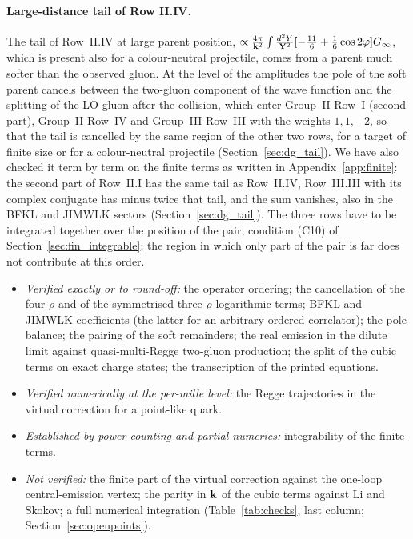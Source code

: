 \paragraph{Large-distance tail of Row II.IV.} The tail of Row~II.IV at large parent position, $\propto\frac{4\pi}{\mathbf{k}^2}\int\frac{d^2Y}{\mathbf{Y}^2}[-\frac{11}{6}+\frac16\cos2\varphi]G_\infty$, which is present also for a colour-neutral projectile, comes from a parent much softer than the observed gluon. At the level of the amplitudes the pole of the soft parent cancels between the two-gluon component of the wave function and the splitting of the LO gluon after the collision, which enter Group~II Row~I (second part), Group~II Row~IV and Group~III Row~III with the weights $1,1,-2$, so that the tail is cancelled by the same region of the other two rows, for a target of finite size or for a colour-neutral projectile (Section~\ref{sec:dg_tail}). We have also checked it term by term on the finite terms as written in Appendix~\ref{app:finite}: the second part of Row~II.I has the same tail as Row~II.IV, Row~III.III with its complex conjugate has minus twice that tail, and the sum vanishes, also in the BFKL and JIMWLK sectors (Section~\ref{sec:dg_tail}). The three rows have to be integrated together over the position of the pair, condition (C10) of Section~\ref{sec:fin_integrable}; the region in which only part of the pair is far does not contribute at this order.

\begin{summarybox}
\begin{itemize}
\item \emph{Verified exactly or to round-off:} the operator ordering; the cancellation of the four-$\rho$ and of the symmetrised three-$\rho$ logarithmic terms; BFKL and JIMWLK coefficients (the latter for an arbitrary ordered correlator); the pole balance; the pairing of the soft remainders; the real emission in the dilute limit against quasi-multi-Regge two-gluon production; the split of the cubic terms on exact charge states; the transcription of the printed equations.
\item \emph{Verified numerically at the per-mille level:} the Regge trajectories in the virtual correction for a point-like quark.
\item \emph{Established by power counting and partial numerics:} integrability of the finite terms.
\item \emph{Not verified:} the finite part of the virtual correction against the one-loop central-emission vertex; the parity in $\mathbf{k}$ of the cubic terms against Li and Skokov; a full numerical integration (Table~\ref{tab:checks}, last column; Section~\ref{sec:openpoints}).
\end{itemize}
\end{summarybox}
